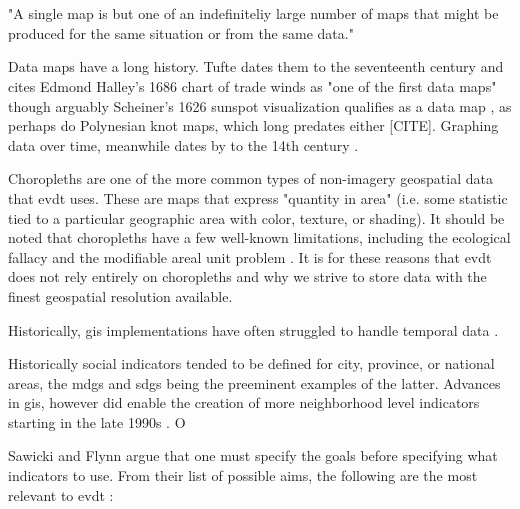 \chapter{} \label{ch:method}



\section{}


"A single map is but one of an indefiniteliy large number of maps that might be produced for the same situation or from the same data." \cite{monmonierHowLieMaps1996}

Data maps have a long history. Tufte dates them to the seventeenth century and cites Edmond Halley's 1686 chart of trade winds as "one of the first data maps" \cite{tufteVisualDisplayQuantitative2001} though arguably Scheiner's 1626 sunspot visualization qualifies as a data map \cite{friendlyBriefHistoryData2008}, as perhaps do Polynesian knot maps, which long predates either [CITE]. Graphing data over time, meanwhile dates by to the 14th century \cite{friendlyBriefHistoryData2008}.

Choropleths are one of the more common types of non-imagery geospatial data that \ac{evdt} uses. These are maps that express "quantity in area" (i.e. some statistic tied to a particular geographic area with color, texture, or shading). It should be noted that choropleths have a few well-known limitations, including the ecological fallacy and the modifiable areal unit problem \cite{cramptonRethinkingMapsIdentity2011, sawickiNeighborhoodIndicatorsReview1996}. It is for these reasons that \ac{evdt} does not rely entirely on choropleths and why we strive to store data with the finest geospatial resolution available.

Historically, \ac{gis} implementations have often struggled to handle temporal data \cite{harrisLocationalModelsGeographic1993}.

Historically social indicators tended to be defined for city, province, or national areas, the \acp{mdg} and \acp{sdg} being the preeminent examples of the latter. Advances in \ac{gis}, however did enable the creation of more neighborhood level indicators starting in the late 1990s \cite{sawickiNeighborhoodIndicatorsReview1996}. O

Sawicki and Flynn argue that one must specify the goals before specifying what indicators to use. From their list of possible aims, the following are the most relevant to \ac{evdt} \cite{sawickiNeighborhoodIndicatorsReview1996}:

